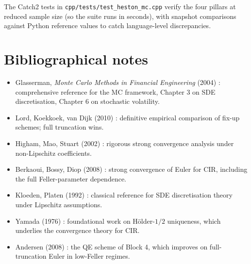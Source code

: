 \documentclass[11pt]{article}
\theoremstyle{plain}
\theoremstyle{definition}
\theoremstyle{remark}
\begin{document}
The Catch2 tests in \texttt{cpp/tests/test\_heston\_mc.cpp} verify the four pillars at reduced sample size (so the suite runs in seconds), with snapshot comparisons against Python reference values to catch language-level discrepancies.

\section{Bibliographical notes}

\begin{itemize}[topsep=2pt]
    \item Glasserman, \emph{Monte Carlo Methods in Financial Engineering} (2004) \cite{Glasserman2004}: comprehensive reference for the MC framework, Chapter 3 on SDE discretisation, Chapter 6 on stochastic volatility.
    \item Lord, Koekkoek, van Dijk (2010) \cite{LKvD2010}: definitive empirical comparison of fix-up schemes; full truncation wins.
    \item Higham, Mao, Stuart (2002) \cite{HighamMaoStuart2002}: rigorous strong convergence analysis under non-Lipschitz coefficients.
    \item Berkaoui, Bossy, Diop (2008) \cite{BerkaouiBossyDiop2008}: strong convergence of Euler for CIR, including the full Feller-parameter dependence.
    \item Kloeden, Platen (1992) \cite{KloedenPlaten1992}: classical reference for SDE discretisation theory under Lipschitz assumptions.
    \item Yamada (1976) \cite{Yamada1976}: foundational work on H\"older-$1/2$ uniqueness, which underlies the convergence theory for CIR.
    \item Andersen (2008) \cite{Andersen2008}: the QE scheme of Block 4, which improves on full-truncation Euler in low-Feller regimes.
\end{itemize}
\end{document}
